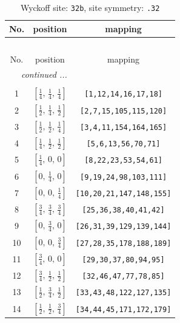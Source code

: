 \documentclass[fleqn,8pt]{jsarticle}
\begin{document}
\renewcommand{\arraystretch}{1.2}
\begin{longtable}{ccc}
\caption{Wyckoff site: {\tt 32b}, site symmetry: {\tt .32}}
 \\
 \hline \hline
No. & position & mapping \\ \hline \endfirsthead

\multicolumn{2}{l}{\tablename\ \thetable{}} \\
 \hline \hline
No. & position & mapping \\ \hline \endhead

 \hline \hline
\multicolumn{2}{r}{\footnotesize\it continued ...} \\ \endfoot

 \hline \hline
\multicolumn{2}{r}{} \\ \endlastfoot

1 & $\left[ \frac{1}{4},\, \frac{1}{4},\, \frac{1}{4} \right]$ & {\tt [1,12,14,16,17,18]} \\ \hline
2 & $\left[ \frac{1}{2},\, \frac{1}{4},\, \frac{1}{2} \right]$ & {\tt [2,7,15,105,115,120]} \\ \hline
3 & $\left[ \frac{1}{2},\, \frac{1}{2},\, \frac{1}{4} \right]$ & {\tt [3,4,11,154,164,165]} \\ \hline
4 & $\left[ \frac{1}{4},\, \frac{1}{2},\, \frac{1}{2} \right]$ & {\tt [5,6,13,56,70,71]} \\ \hline
5 & $\left[ \frac{1}{4},\, 0,\, 0 \right]$ & {\tt [8,22,23,53,54,61]} \\ \hline
6 & $\left[ 0,\, \frac{1}{4},\, 0 \right]$ & {\tt [9,19,24,98,103,111]} \\ \hline
7 & $\left[ 0,\, 0,\, \frac{1}{4} \right]$ & {\tt [10,20,21,147,148,155]} \\ \hline
8 & $\left[ \frac{3}{4},\, \frac{3}{4},\, \frac{3}{4} \right]$ & {\tt [25,36,38,40,41,42]} \\ \hline
9 & $\left[ 0,\, \frac{3}{4},\, 0 \right]$ & {\tt [26,31,39,129,139,144]} \\ \hline
10 & $\left[ 0,\, 0,\, \frac{3}{4} \right]$ & {\tt [27,28,35,178,188,189]} \\ \hline
11 & $\left[ \frac{3}{4},\, 0,\, 0 \right]$ & {\tt [29,30,37,80,94,95]} \\ \hline
12 & $\left[ \frac{3}{4},\, \frac{1}{2},\, \frac{1}{2} \right]$ & {\tt [32,46,47,77,78,85]} \\ \hline
13 & $\left[ \frac{1}{2},\, \frac{3}{4},\, \frac{1}{2} \right]$ & {\tt [33,43,48,122,127,135]} \\ \hline
14 & $\left[ \frac{1}{2},\, \frac{1}{2},\, \frac{3}{4} \right]$ & {\tt [34,44,45,171,172,179]} \\ \hline

\end{longtable}
\end{document}
